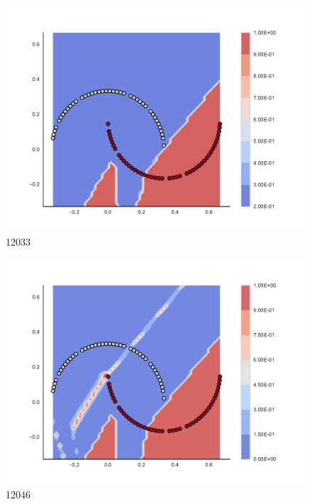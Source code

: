 \begin{subfigure}[b]{0.09\textwidth}
    \includegraphics[clip, trim=2.35cm 1.75cm 4.5cm 0cm,width=\textwidth]{img/convergence/12033.pdf}
    \caption{12033}
    \label{fig:convergence_12033}
\end{subfigure}
%
\begin{subfigure}[b]{0.09\textwidth}
    \includegraphics[clip, trim=2.35cm 1.75cm 4.5cm 0cm,width=\textwidth]{img/convergence/12046.pdf}
    \caption{12046}
    \label{fig:convergence_12046}
\end{subfigure}
%
